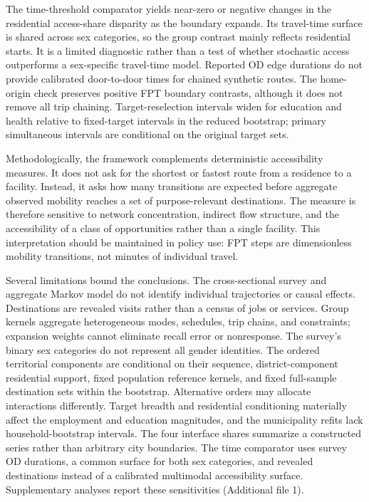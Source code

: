 \documentclass[11pt]{article}
\begin{document}
The time-threshold comparator yields near-zero or negative changes in the residential access-share disparity as the boundary expands. Its travel-time surface is shared across sex categories, so the group contrast mainly reflects residential starts. It is a limited diagnostic rather than a test of whether stochastic access outperforms a sex-specific travel-time model. Reported OD edge durations do not provide calibrated door-to-door times for chained synthetic routes. The home-origin check preserves positive FPT boundary contrasts, although it does not remove all trip chaining. Target-reselection intervals widen for education and health relative to fixed-target intervals in the reduced bootstrap; primary simultaneous intervals are conditional on the original target sets.

Methodologically, the framework complements deterministic accessibility measures. It does not ask for the shortest or fastest route from a residence to a facility. Instead, it asks how many transitions are expected before aggregate observed mobility reaches a set of purpose-relevant destinations. The measure is therefore sensitive to network concentration, indirect flow structure, and the accessibility of a class of opportunities rather than a single facility. This interpretation should be maintained in policy use: FPT steps are dimensionless mobility transitions, not minutes of individual travel.

Several limitations bound the conclusions. The cross-sectional survey and aggregate Markov model do not identify individual trajectories or causal effects. Destinations are revealed visits rather than a census of jobs or services. Group kernels aggregate heterogeneous modes, schedules, trip chains, and constraints; expansion weights cannot eliminate recall error or nonresponse. The survey's binary sex categories do not represent all gender identities. The ordered territorial components are conditional on their sequence, district-component residential support, fixed population reference kernels, and fixed full-sample destination sets within the bootstrap. Alternative orders may allocate interactions differently. Target breadth and residential conditioning materially affect the employment and education magnitudes, and the municipality refits lack household-bootstrap intervals. The four interface shares summarize a constructed series rather than arbitrary city boundaries. The time comparator uses survey OD durations, a common surface for both sex categories, and revealed destinations instead of a calibrated multimodal accessibility surface. Supplementary analyses report these sensitivities (Additional file 1).
\end{document}
